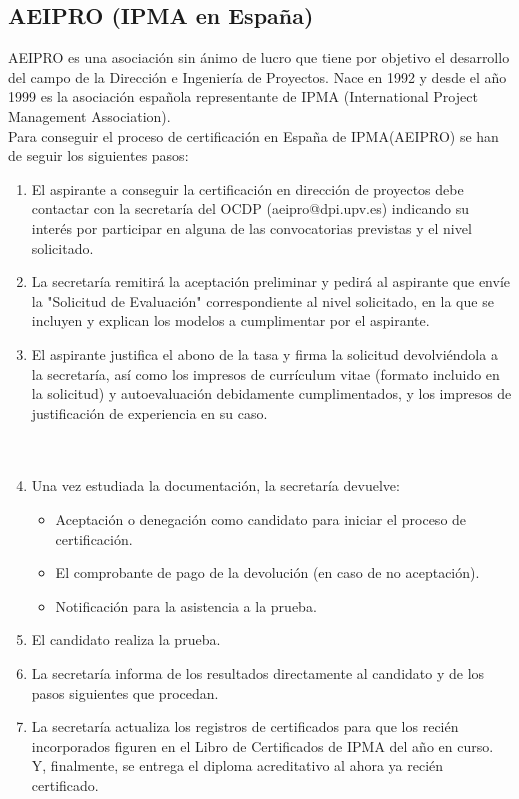 \subsection{AEIPRO (IPMA en España)}

AEIPRO es una asociación sin ánimo de lucro que tiene por objetivo el desarrollo del campo de la Dirección e Ingeniería de Proyectos. Nace en 1992 y desde el año 1999 es la asociación española representante de IPMA (International Project Management Association).\\

Para conseguir el proceso de certificación en España de IPMA(AEIPRO) se han de seguir los siguientes pasos:\\
\begin{enumerate}
	\item El aspirante a conseguir la certificación en dirección de proyectos debe contactar con la secretaría del OCDP (aeipro@dpi.upv.es) indicando su interés por participar en alguna de las convocatorias previstas y el nivel solicitado.\\
	\item La secretaría remitirá la aceptación preliminar y pedirá al aspirante que envíe la "Solicitud de Evaluación" correspondiente al nivel solicitado, en la que se incluyen y explican los modelos a cumplimentar por el aspirante.\\
	\item El aspirante justifica el abono de la tasa y firma la solicitud devolviéndola a la secretaría, así como los impresos de currículum vitae (formato incluido en la solicitud) y autoevaluación debidamente cumplimentados, y los impresos de justificación de experiencia en su caso.\\ \\ \\
	\item Una vez estudiada la documentación, la secretaría devuelve:
	\begin{itemize}
		\item Aceptación o denegación como candidato para iniciar el proceso de certificación.
		\item El comprobante de pago de la devolución (en caso de no aceptación).
		\item Notificación para la asistencia a la prueba.
	\end{itemize}
	\item El candidato realiza la prueba.\\
	\item La secretaría informa de los resultados directamente al candidato y de los pasos siguientes que procedan.\\
	\item La secretaría actualiza los registros de certificados para que los recién incorporados figuren en el Libro de Certificados de IPMA del año en curso. Y, finalmente, se entrega el diploma acreditativo al ahora ya recién certificado.\\
\end{enumerate}
